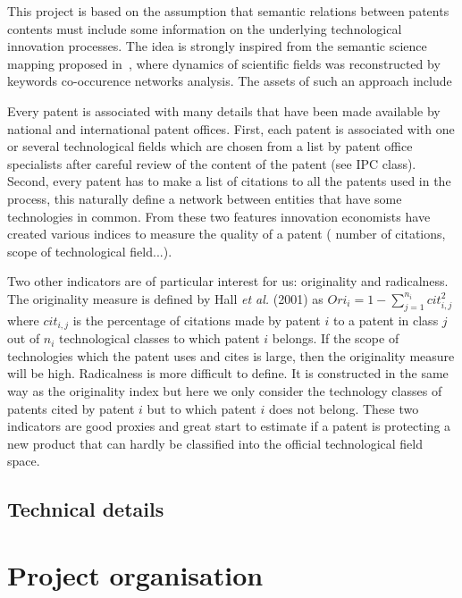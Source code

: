 This project is based on the assumption that semantic relations between patents contents must include some information on the underlying technological innovation processes. The idea is strongly inspired from the semantic science mapping proposed in~\cite{chavalarias2013phylomemetic}, where dynamics of scientific fields was reconstructed by keywords co-occurence networks analysis. The assets of such an approach include

Every patent is associated with many details that have been made available by national and international patent offices. First, each patent is associated with one or several technological fields which are chosen from a list by patent office specialists after careful review of the content of the patent (see IPC class). Second, every patent has to make a list of citations to all the patents used in the process, this naturally define a network between entities that have some technologies in common. From these two features innovation economists have created various indices to measure the quality of a patent ( number of citations, scope of technological field...).

Two other indicators are of particular interest for us: originality and radicalness. The originality measure is
defined by Hall \textit{et al.} (2001) \cite{Hall2001} as $Ori_{i}%
=1-\displaystyle\sum_{j=1}^{n_{i}}{cit_{i,j}^{2}}$ where $cit_{i,j}$ is the
percentage of citations made by patent $i$ to a patent in class $j$ out of
$n_{i}$ technological classes to which patent $i$ belongs. If the scope of
technologies which the patent uses and cites is large, then the originality
measure will be high. Radicalness is more difficult to define. It is
constructed in the same way as the originality index but here we only consider
the technology classes of patents cited by patent $i$ but to which patent $i$
does not belong. These two indicators are good proxies and great start to estimate if a patent is protecting a new product that can hardly be classified into the official technological field space.

\subsection{Technical details}






\section{Project organisation}


